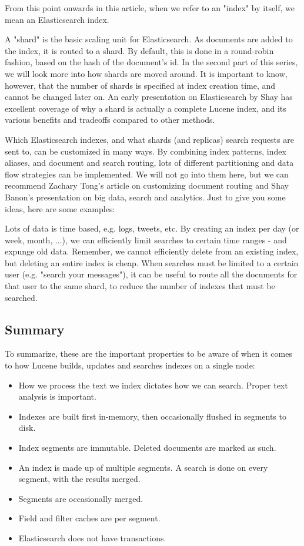 From this point onwards in this article, when we refer to an "index" by itself, we mean an Elasticsearch index.

A "shard" is the basic scaling unit for Elasticsearch. As documents are added to the index, it is routed to a shard. By default, this is done in a round-robin fashion, based on the hash of the document's id. In the second part of this series, we will look more into how shards are moved around. It is important to know, however, that the number of shards is specified at index creation time, and cannot be changed later on. An early presentation on Elasticsearch by Shay has excellent coverage of why a shard is actually a complete Lucene index, and its various benefits and tradeoffs compared to other methods.

Which Elasticsearch indexes, and what shards (and replicas) search requests are sent to, can be customized in many ways. By combining index patterns, index aliases, and document and search routing, lots of different partitioning and data flow strategies can be implemented. We will not go into them here, but we can recommend Zachary Tong's article on customizing document routing and Shay Banon's presentation on big data, search and analytics. Just to give you some ideas, here are some examples:

Lots of data is time based, e.g. logs, tweets, etc. By creating an index per day (or week, month, ...), we can efficiently limit searches to certain time ranges - and expunge old data. Remember, we cannot efficiently delete from an existing index, but deleting an entire index is cheap.
When searches must be limited to a certain user (e.g. "search your messages"), it can be useful to route all the documents for that user to the same shard, to reduce the number of indexes that must be searched.

\subsection*{Summary}

To summarize, these are the important properties to be aware of when it comes to how Lucene builds, updates and searches indexes on a single node:

\begin{itemize}
\item How we process the text we index dictates how we can search. Proper text analysis is important.
\item Indexes are built first in-memory, then occasionally flushed in segments to disk.
\item Index segments are immutable. Deleted documents are marked as such.
\item An index is made up of multiple segments. A search is done on every segment, with the results merged.
\item Segments are occasionally merged.
\item Field and filter caches are per segment.
\item Elasticsearch does not have transactions.
\end{itemize}